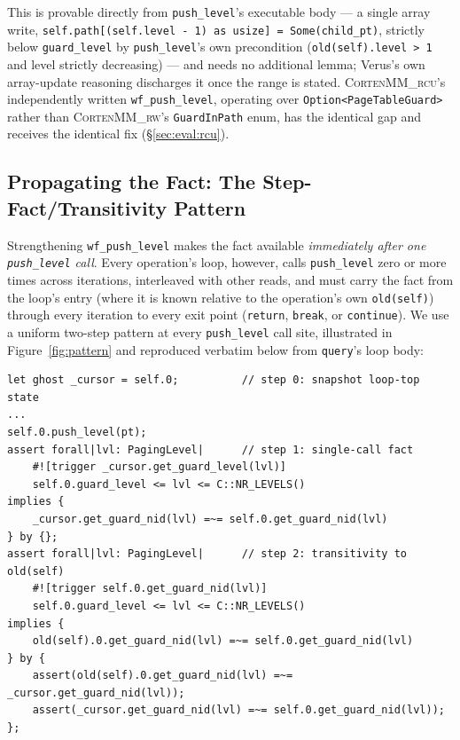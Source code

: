 \documentclass[10pt]{article}
\newcommand{\corten}[1]{\textsc{CortenMM\_#1}}
\newcommand{\vfn}[1]{\texttt{#1}}
\begin{document}
This is provable directly from \vfn{push\_level}'s executable body ---
a single array write, \lstinline[style=verus]{self.path[(self.level - 1) as usize] = Some(child_pt)},
strictly below \vfn{guard\_level} by \vfn{push\_level}'s own
precondition (\vfn{old(self).level > 1} and level strictly decreasing)
--- and needs no additional lemma; Verus's own array-update reasoning
discharges it once the range is stated. \corten{rcu}'s independently
written \vfn{wf\_push\_level}, operating over
\vfn{Option<PageTableGuard>} rather than \corten{rw}'s
\vfn{GuardInPath} enum, has the identical gap and receives the
identical fix (\S\ref{sec:eval:rcu}).

\subsection{Propagating the Fact: The Step-Fact/Transitivity Pattern}
\label{sec:method:sites}

Strengthening \vfn{wf\_push\_level} makes the fact available
\emph{immediately after one \vfn{push\_level} call}. Every operation's
loop, however, calls \vfn{push\_level} zero or more times across
iterations, interleaved with other reads, and must carry the fact from
the loop's entry (where it is known relative to the operation's own
\vfn{old(self)}) through every iteration to every exit point (\vfn{return},
\vfn{break}, or \vfn{continue}). We use a uniform two-step pattern at
every \vfn{push\_level} call site, illustrated in
Figure~\ref{fig:pattern} and reproduced verbatim below from
\vfn{query}'s loop body:

\begin{lstlisting}[style=verus]
let ghost _cursor = self.0;          // step 0: snapshot loop-top state
...
self.0.push_level(pt);
assert forall|lvl: PagingLevel|      // step 1: single-call fact
    #![trigger _cursor.get_guard_level(lvl)]
    self.0.guard_level <= lvl <= C::NR_LEVELS()
implies {
    _cursor.get_guard_nid(lvl) =~= self.0.get_guard_nid(lvl)
} by {};
assert forall|lvl: PagingLevel|      // step 2: transitivity to old(self)
    #![trigger self.0.get_guard_nid(lvl)]
    self.0.guard_level <= lvl <= C::NR_LEVELS()
implies {
    old(self).0.get_guard_nid(lvl) =~= self.0.get_guard_nid(lvl)
} by {
    assert(old(self).0.get_guard_nid(lvl) =~= _cursor.get_guard_nid(lvl));
    assert(_cursor.get_guard_nid(lvl) =~= self.0.get_guard_nid(lvl));
};
\end{lstlisting}
\end{document}
